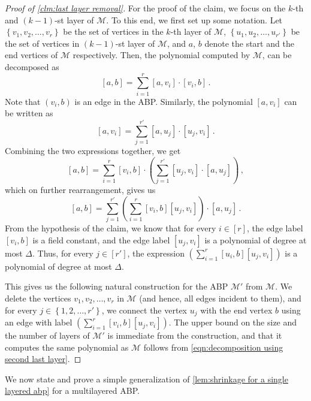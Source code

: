 \documentclass[10pt,a4paper]{article}
\newcommand{\set}[1]{\left\{#1\right\}}
\newcommand{\inparen}[1]{\left(#1\right)}
\begin{document}
\begin{proof}[Proof of \autoref{clm:last layer removal}]
	For the proof of the claim, we  focus on the $k$-th and $(k-1)$-st layer of $\mathcal{M}$. To this end, we first set up some notation. Let $\set{v_1, v_2, \ldots, v_r}$ be the set of vertices in the $k$-th layer of $\mathcal{M}$, $\set{u_1, u_2, \ldots, u_{r'}}$ be the set of vertices in $(k-1)$-st layer of $\mathcal{M}$, and $a$, $b$ denote the start and the end vertices of $\mathcal{M}$ respectively. Then, the polynomial computed by $\mathcal{M}$, can be decomposed as 
	\[
		[a,b] = \sum_{i = 1}^r [a, v_i] \cdot  [v_i, b]\, .
	\]
	Note that $(v_i,b)$ is an edge in the ABP. Similarly, the polynomial $[a,v_i]$ can be written as 
	\[
		[a,v_i] = \sum_{j = 1}^{r'} [a, u_j] \cdot [u_j, v_i] \, .
	\]
	Combining the two expressions together, we get  
	\[
		[a,b] = \sum_{i = 1}^r [v_i, b] \cdot  \inparen{\sum_{j = 1}^{r'} [u_j,v_i] \cdot [a, u_j]}\, ,
	\]
	which on further rearrangement,  gives us 
	\begin{equation} \label{eqn:decomposition using second last layer}
		[a,b] = \sum_{j = 1}^{r'} \inparen{\sum_{i = 1}^{r} [v_i,b] [u_j, v_i]} \cdot [a, u_j] \, .
	\end{equation}
 	From the hypothesis of the claim, we know that for every $i \in [r]$, the edge label $[v_i,b]$ is a field constant, and the edge label $[u_j, v_i]$ is a polynomial of degree at most $\Delta$. Thus, for every $j \in [r']$, the expression $\inparen{\sum_{i = 1}^{r} [u_i,b] [u_j,v_i]}$ is a polynomial of degree at most $\Delta$.
 	
 	This gives us the following natural construction for the ABP $\mathcal{M}'$ from $\mathcal{M}$. We delete the vertices $v_1, v_2, \ldots, v_r$ in $\mathcal{M}$ (and hence, all edges incident to them), and for every $j \in \set{1, 2, \ldots, r'}$, we connect the vertex $u_j$ with the end vertex $b$ using an edge with label $\inparen{\sum_{i = 1}^{r} [v_i,b] [u_j, v_i]}$. The upper bound on the size and the number of layers of $\mathcal{M}'$ is immediate from the construction, and that it computes the same polynomial as $\mathcal{M}$ follows from \autoref{eqn:decomposition using second last layer}.
 \end{proof}	

We now state and prove a simple generalization of \autoref{lem:shrinkage for a single layered abp} for a multilayered ABP. 
	
\end{document}
